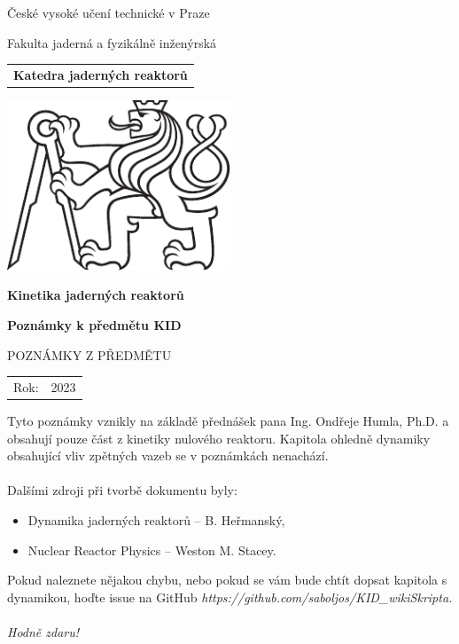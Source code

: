 \documentclass[a4paper, 11pt]{article}
\newcommand{\logoCVUT}{\includegraphics[width = 0.5\textwidth]{img/symbol_cvut_konturova_verze_cb.pdf}}
\begin{document}
%
%

\thispagestyle{empty}

\begin{center}
	{\LARGE
		České vysoké učení technické v Praze \par
		Fakulta jaderná a fyzikálně inženýrská
	}
    \vspace{10mm}

    \begin{tabular}{c}
		\textbf{Katedra jaderných reaktorů} \\[3pt]
    \end{tabular}

   \vspace{10mm} \logoCVUT \vspace{15mm}

   {\huge \textbf{Kinetika jaderných reaktorů}\par}
   \vspace{5mm}
   {\huge \textbf{Poznámky k předmětu KID}\par}

   \vspace{15mm}
   {\Large \MakeUppercase{Poznámky z předmětu}}

   \vfill
   {\large
    \begin{tabular}{ll}
    Rok: & 2023
    \end{tabular}
   }
\end{center}

\newpage
\thispagestyle{empty}

\vfill

\vspace{1em}
Tyto poznámky vznikly na základě přednášek pana Ing. Ondřeje Humla, Ph.D. a obsahují pouze část z kinetiky nulového reaktoru. Kapitola ohledně dynamiky obsahující vliv zpětných vazeb se v poznámkách nenachází.\\
\\
Dalšími zdroji při tvorbě dokumentu byly:

\begin{itemize}
    \item Dynamika jaderných reaktorů -- B. Heřmanský,
    \item Nuclear Reactor Physics -- Weston M. Stacey.
\end{itemize}

Pokud naleznete nějakou chybu, nebo pokud se vám bude chtít dopsat kapitola s dynamikou, hoďte issue na GitHub \it{https://github.com/saboljos/KID\_wikiSkripta}.\\
\\
\rm Hodně zdaru!

\vspace{2em}

\clearpage{\pagestyle{empty}}



\newpage
\parskip=0pt
\begin{small}
\tableofcontents
\end{small}
\parskip=7pt
\newpage





%
\end{document}
